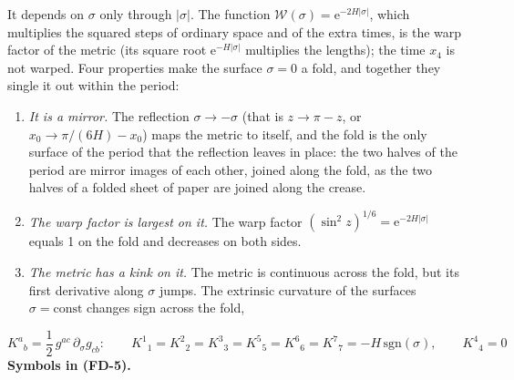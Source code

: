 \documentclass[
  10pt,
]{article}
\providecommand{\tightlist}{%
  \setlength{\itemsep}{0pt}\setlength{\parskip}{0pt}}
\begin{document}
It depends on \(\sigma\) only through \(\lvert\sigma\rvert\). The
function \(\mathcal{W}(\sigma) = \mathrm{e}^{-2H\lvert\sigma\rvert}\),
which multiplies the squared steps of ordinary space and of the extra
times, is the warp factor of the metric (its square root
\(\mathrm{e}^{-H\lvert\sigma\rvert}\) multiplies the lengths); the time
\(x_4\) is not warped. Four properties make the surface \(\sigma = 0\) a
fold, and together they single it out within the period:

\begin{enumerate}
\def\labelenumi{\arabic{enumi}.}
\tightlist
\item
  \emph{It is a mirror.} The reflection \(\sigma \to -\sigma\) (that is
  \(z \to \pi - z\), or \(x_0 \to \pi/(6H) - x_0\)) maps the metric to
  itself, and the fold is the only surface of the period that the
  reflection leaves in place: the two halves of the period are mirror
  images of each other, joined along the fold, as the two halves of a
  folded sheet of paper are joined along the crease.
\item
  \emph{The warp factor is largest on it.} The warp factor
  \((\sin^2z)^{1/6} = \mathrm{e}^{-2H\lvert\sigma\rvert}\) equals 1 on
  the fold and decreases on both sides.
\item
  \emph{The metric has a kink on it.} The metric is continuous across
  the fold, but its first derivative along \(\sigma\) jumps. The
  extrinsic curvature of the surfaces \(\sigma = \text{const}\) changes
  sign across the fold,
\end{enumerate}

\[
K^a{}_b = \frac12\,g^{ac}\,\partial_\sigma g_{cb}:\qquad
K^{1}{}_{1} = K^{2}{}_{2} = K^{3}{}_{3} = K^{5}{}_{5} = K^{6}{}_{6} = K^{7}{}_{7} = -H\,\mathrm{sgn}(\sigma),\qquad K^{4}{}_{4} = 0 \tag{FD-5}
\] \textbf{Symbols in (FD-5).}
\end{document}
